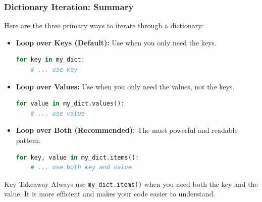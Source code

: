 \documentclass{beamer}
\begin{document}
\begin{frame}[fragile]
    \frametitle{Dictionary Iteration: Summary}

    Here are the three primary ways to iterate through a dictionary:

    \begin{itemize}
        \item \textbf{Loop over Keys (Default):} Use when you only need the keys.
        \begin{lstlisting}[language=Python, basicstyle=\small\ttfamily]
for key in my_dict:
    # ... use key
        \end{lstlisting}

        \item \textbf{Loop over Values:} Use when you only need the values, not the keys.
        \begin{lstlisting}[language=Python, basicstyle=\small\ttfamily]
for value in my_dict.values():
    # ... use value
        \end{lstlisting}

        \item \textbf{Loop over Both (Recommended):} The most powerful and readable pattern.
        \begin{lstlisting}[language=Python, basicstyle=\small\ttfamily]
for key, value in my_dict.items():
    # ... use both key and value
        \end{lstlisting}
    \end{itemize}

    \begin{block}{Key Takeaway}
    Always use \texttt{my\_dict.items()} when you need both the key and the value. It is more efficient and makes your code easier to understand.
    \end{block}
\end{frame}
\end{document}
